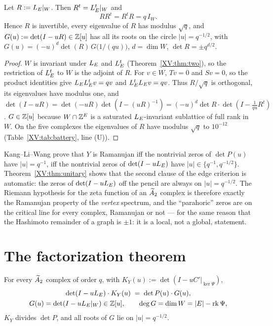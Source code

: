 \begin{theorem}\label{XV:thm:unitary}
Let $R:=L_E|_W$. Then $R^{t}=L_E^{t}|_W$ and
\[
RR^{t}=R^{t}R=q\,I_W .
\]
Hence $R$ is invertible, every eigenvalue of $R$ has modulus $\sqrt q$, and
$G(u):=\det(I-uR)\in\mathbb{Z}[u]$ has all its roots on the circle $|u|=q^{-1/2}$, with
$G(u)=(-u)^{d}\det(R)\,G\bigl(1/(qu)\bigr)$, $d=\dim W$, $\det R=\pm q^{d/2}$.
\end{theorem}

\begin{proof}
$W$ is invariant under $L_E$ and $L_E^{t}$ (Theorem~\ref{XV:thm:two}), so the restriction of
$L_E^{t}$ to $W$ is the adjoint of $R$. For $v\in W$, $Tv=0$ and $Sv=0$, so the product
identities give $L_EL_E^{t}v=qv$ and $L_E^{t}L_E v=qv$. Thus $R/\sqrt q$ is orthogonal, its
eigenvalues have modulus one, and $\det(I-uR)=\det(-uR)\det(I-(uR)^{-1})
=(-u)^{d}\det R\cdot\det(I-\tfrac1{qu}R^{t})$. $G\in\mathbb{Z}[u]$ because $W\cap\mathbb{Z}^{E}$ is a
saturated $L_E$-invariant sublattice of full rank in $W$. On the five complexes the
eigenvalues of $R$ have modulus $\sqrt q$ to $10^{-12}$ (Table~\ref{XV:tab:battery}, line (U)).
\end{proof}

\begin{remark}\label{XV:rem:RH}
Kang--Li--Wang \cite[Thm.~1.5.1]{KLW} prove that $Y$ is Ramanujan iff the nontrivial zeros of
$\det P(u)$ have $|u|=q^{-1}$, iff the nontrivial zeros of $\det(I-uL_E)$ have $|u|\in\{q^{-1},
q^{-1/2}\}$. Theorem~\ref{XV:thm:unitary} shows that the second clause of the edge criterion is
automatic: the zeros of $\det(I-uL_E)$ off the pencil are always on $|u|=q^{-1/2}$. The
Riemann hypothesis for the zeta function of an $\widetilde A_2$ complex is therefore exactly the
Ramanujan property of the \emph{vertex} spectrum, and the ``parahoric'' zeros are on the
critical line for every complex, Ramanujan or not --- for the same reason that the Hashimoto
remainder of a graph is $\pm1$: it is a local, not a global, statement.
\end{remark}

\section{The factorization theorem}\label{XV:sec:factor}

\begin{theorem}\label{XV:thm:factor}
For every $\widetilde A_2$ complex of order $q$, with $K_Y(u):=\det(I-uC'|_{\ker\Psi})$,
\begin{gather*}
\det(I-uL_E)\cdot K_Y(u)\;=\;\det P(u)\cdot G(u),\\
G(u)=\det(I-uL_E|_W)\in\mathbb{Z}[u],\qquad \deg G=\dim W=|E|-\operatorname{rk}\Psi ,
\end{gather*}
$K_Y$ divides $\det P$, and all roots of $G$ lie on $|u|=q^{-1/2}$.
\end{theorem}

